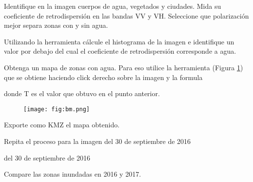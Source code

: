 \begin{que}
    Identifique en la imagen cuerpos de agua, vegetados y ciudades. Mida su coeficiente de retrodispersión en las bandas VV y VH. Seleccione que polarización mejor separa zonas con y sin agua.
\end{que}

\begin{que}
    Utilizando la herramienta  cálcule el histograma de la imagen e identifique un valor por debajo del cual el coeficiente de retrodispersión corresponde a agua.
\end{que}

\begin{que}
    Obtenga un mapa de zonas con agua. Para eso utilice la herramienta  (Figura \ref{fig:bm}) que se obtiene haciendo click derecho sobre la imagen y la formula
    \begin{center}
    \end{center}
    donde T es el valor que obtuvo en el punto anterior.
    \begin{figure}[h!]
        \centering
        \texttt{[image: fig:bm.png]}
        \caption{}
        \label{fig:bm}
    \end{figure}
\end{que}

\begin{que}
    Exporte como KMZ el mapa obtenido.
\end{que}

\begin{que}
    Repita el proceso para la imagen del 30 de septiembre de 2016
    \begin{center}
    \end{center}
    del 30 de septiembre de 2016
\end{que}

\begin{que}
    Compare las zonas inundadas en 2016 y 2017.
\end{que}
